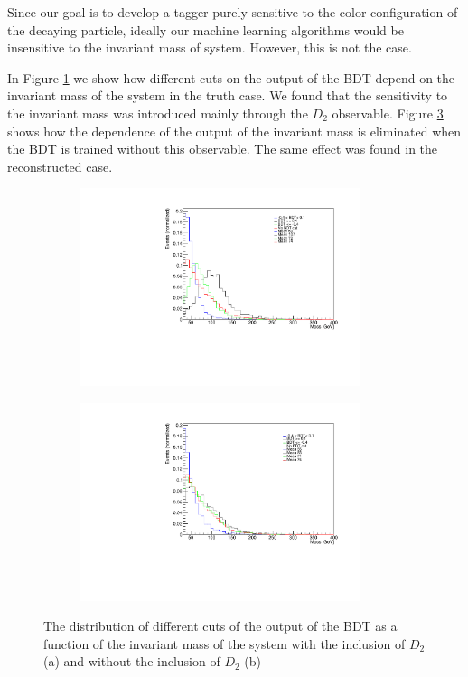 \documentclass[10pt,a4paper]{book}
\begin{document}
Since our goal is to develop a tagger purely sensitive to the color configuration of the decaying particle, ideally our machine learning algorithms would be insensitive to the invariant mass of system. However, this is not the case.

In Figure \ref{bdt with d2} we show how different cuts on the output of the BDT depend on the invariant mass of the system in the truth case. We found that the sensitivity to the invariant mass was introduced mainly through the $D_2$ observable. Figure \ref{bdt w/o d2} shows how the dependence of the output of the invariant mass is eliminated when the BDT is trained without this observable. The same effect was found in the reconstructed case.

\begin{figure}[h]
\begin{subfigure}{1.0\textwidth}
\centering
\includegraphics[width=0.9\textwidth]{ch4_images/bdt_with_d2_included}
\caption{}
\label{bdt with d2}
\end{subfigure}
\begin{subfigure}{1.0\textwidth}
\centering
\includegraphics[width=0.9\textwidth]{ch4_images/bdt_no_d2}
\caption{}
\label{bdt w/o d2}
\end{subfigure}
\caption{The distribution of different cuts of the output of the BDT as a function of the invariant mass of the system with the inclusion of $D_2$ (a) and without the inclusion of $D_2$ (b)}
\end{figure} 
\end{document}
